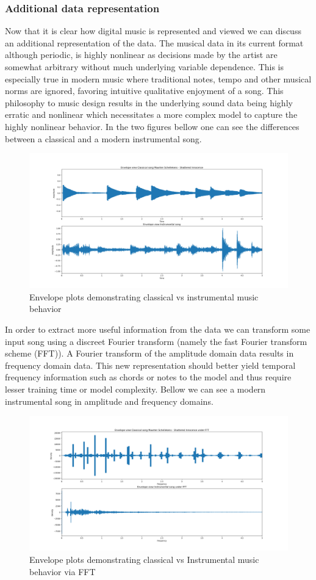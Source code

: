 \documentclass{article}
\begin{document}
\subsubsection{Additional data representation}
Now that it is clear how digital music is represented and viewed we can discuss an additional representation of the data. The musical data in its current format although periodic, is highly nonlinear as decisions made by the artist are somewhat arbitrary without much underlying variable dependence. This is especially true in modern music where traditional notes, tempo and other musical norms are ignored, favoring intuitive qualitative enjoyment of a song. This philosophy to music design results in the underlying sound data being highly erratic and nonlinear which necessitates a more complex model to capture the highly nonlinear behavior. In the two figures bellow one can see the differences between a classical and a modern instrumental song.
\begin{figure}[H]
\caption{Envelope plots demonstrating classical vs instrumental music behavior}
\includegraphics[scale=0.35]{Classical_vs_Instrumental.png}
\end{figure}
In order to extract more useful information from the data we can transform some input song using a discreet Fourier transform (namely the fast Fourier transform scheme (FFT)). A Fourier transform of the amplitude domain data results in frequency domain data. This new representation should better yield temporal frequency information such as chords or notes to the model and thus require lesser training time or model complexity. Bellow we can see a modern instrumental song in amplitude and frequency domains. 
\begin{figure}[H]
\caption{Envelope plots demonstrating classical vs Instrumental music behavior via FFT}
\includegraphics[scale=0.35]{Classical_vs_InstrumentalFFT.png}
\end{figure}
\end{document}
